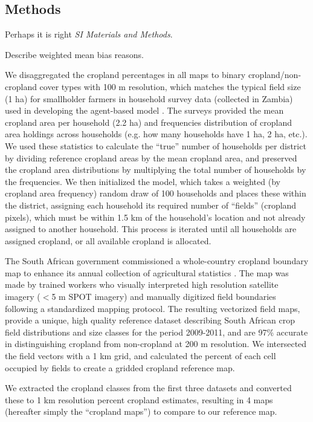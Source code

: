 \documentclass{pnastwo}
\begin{document}
\begin{article}


\begin{materials}
\section{Methods} 
Perhaps it is right {\it SI Materials and Methods}.

Describe weighted mean bias reasons. 

We disaggregated the cropland percentages in all maps to binary cropland/non-cropland cover types with 100 m resolution, which matches the typical field size (1 ha) for smallholder farmers in household survey data (collected in Zambia) used in developing the agent-based model \cite{chen_dependency_2013}. The surveys provided the mean cropland area per household (2.2 ha) and frequencies distribution of cropland area holdings across households (e.g. how many households have 1 ha, 2 ha, etc.). We used these statistics to calculate the ``true'' number of households per district by dividing reference cropland areas by the mean cropland area, and preserved the cropland area distributions by multiplying the total number of households by the frequencies. We then initialized the model, which takes a weighted (by cropland area frequency) random draw of 100 households and places these within the district, assigning each household its required number of ``fields'' (cropland pixels), which must be within 1.5 km of the household's location and not already assigned to another household. This process is iterated until all households are assigned cropland, or all available cropland is allocated. 


The South African government commissioned a whole-country cropland boundary map to enhance its annual collection of agricultural statistics \cite{fourie_better_2009}. The map was made by trained workers who visually interpreted high resolution satellite imagery ($<$5 m SPOT imagery) and manually digitized field boundaries following a standardized mapping protocol. The resulting vectorized field maps, provide a unique, high quality reference dataset describing South African crop field distributions and size classes for the period 2009-2011, and are 97\% accurate in distinguishing cropland from non-cropland at 200 m resolution. We intersected the field vectors with a 1 km grid, and calculated the percent of each cell occupied by fields to create a gridded cropland reference map. 

We extracted the cropland classes from the first three datasets and converted these to 1 km resolution percent cropland estimates, resulting in 4 maps (hereafter simply the ``cropland maps'') to compare to our reference map.  


\end{materials}
\end{article}
\end{document}
